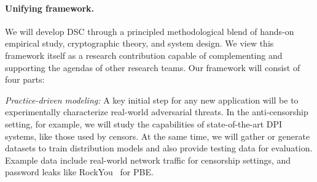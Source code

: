 {%

\newpage

\paragraph{Unifying framework.}
We will develop DSC through a principled methodological 
blend of hands-on empirical study, cryptographic theory, and
system design. We view this framework itself as a research contribution capable
of complementing and supporting the agendas of other research teams.  
Our framework will consist of four parts:
\begin{newenum}

\item{\em Practice-driven modeling:} A key initial step for any new application will be to 
experimentally characterize real-world adversarial threats. In the
anti-censorship setting, for example,  we will study the capabilities of state-of-the-art DPI
systems, like those used by censors.
At the same time, we will gather or generate datasets to train 
distribution models and also provide testing data for evaluation. 
Example data include real-world network traffic for censorship settings, 
and password leaks like RockYou~\cite{RockYou:2009} for PBE. 


\end{newenum}}

